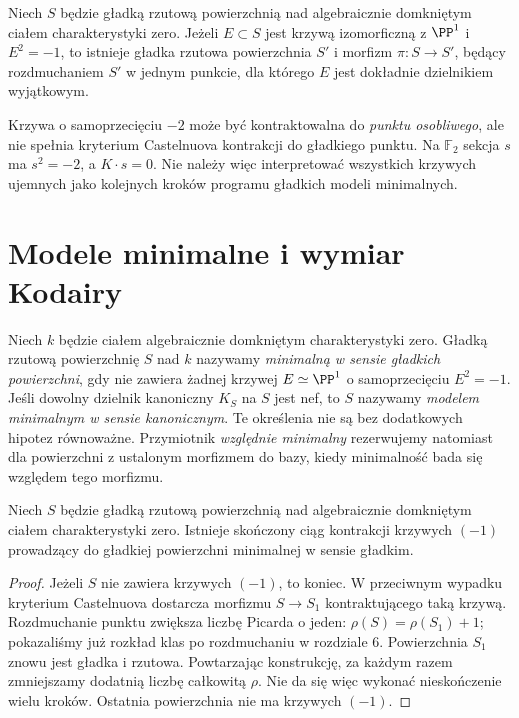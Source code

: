 \begin{twierdzenie}
\label{tw:ga8-castelnuovo-mmp}
Niech $S$ będzie gładką rzutową powierzchnią nad
algebraicznie domkniętym ciałem charakterystyki zero.
Jeżeli $E\subset S$ jest krzywą izomorficzną z $\PP^1$
i $E^2=-1$, to istnieje gładka rzutowa powierzchnia
$S'$ i morfizm $\pi:S\to S'$, będący rozdmuchaniem
$S'$ w jednym punkcie, dla którego $E$ jest dokładnie
dzielnikiem wyjątkowym.
\end{twierdzenie}

\begin{uwaga}
Krzywa o samoprzecięciu $-2$ może być kontraktowalna
do \emph{punktu osobliwego}, ale nie spełnia kryterium
Castelnuova kontrakcji do gładkiego punktu.
Na $\mathbb F_2$ sekcja $s$ ma $s^2=-2$,
a $K\cdot s=0$. Nie należy więc interpretować
wszystkich krzywych ujemnych jako kolejnych kroków
programu gładkich modeli minimalnych.
\end{uwaga}

\section{Modele minimalne i wymiar Kodairy}
\label{sec:ga8-kodaira-minimal}

\begin{definicja}
\label{def:ga8-minimal}
Niech $k$ będzie ciałem algebraicznie domkniętym
charakterystyki zero. Gładką rzutową powierzchnię
$S$ nad $k$ nazywamy
\emph{minimalną w sensie gładkich powierzchni},
gdy nie zawiera żadnej krzywej $E\simeq\PP^1$
o samoprzecięciu $E^2=-1$. Jeśli dowolny
dzielnik kanoniczny $K_S$ na $S$ jest nef, to $S$ nazywamy \emph{modelem minimalnym w sensie
kanonicznym}. Te określenia nie są bez dodatkowych
hipotez równoważne. Przymiotnik \emph{względnie minimalny}
rezerwujemy natomiast dla powierzchni z ustalonym morfizmem
do bazy, kiedy minimalność bada się względem tego morfizmu.
\end{definicja}

\begin{stwierdzenie}
\label{st:ga8-terminate-minusone}
Niech $S$ będzie gładką rzutową powierzchnią nad
algebraicznie domkniętym ciałem charakterystyki zero.
Istnieje skończony ciąg kontrakcji krzywych $(-1)$
prowadzący do gładkiej powierzchni minimalnej w sensie gładkim.
\end{stwierdzenie}
\begin{proof}
Jeżeli $S$ nie zawiera krzywych $(-1)$, to koniec.
W przeciwnym wypadku kryterium Castelnuova dostarcza
morfizmu $S\to S_1$ kontraktującego taką krzywą.
Rozdmuchanie punktu zwiększa liczbę Picarda o jeden:
$\rho(S)=\rho(S_1)+1$; pokazaliśmy już rozkład
klas po rozdmuchaniu w rozdziale 6. Powierzchnia
$S_1$ znowu jest gładka i rzutowa. Powtarzając
konstrukcję, za każdym razem zmniejszamy dodatnią
liczbę całkowitą $\rho$. Nie da się więc wykonać
nieskończenie wielu kroków. Ostatnia powierzchnia
nie ma krzywych $(-1)$.
\end{proof}

